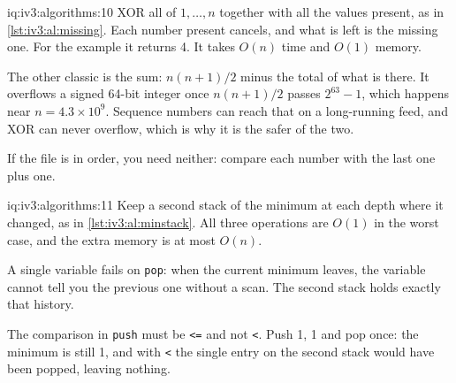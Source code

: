 \begin{solution}{iq:iv3:algorithms:10}
XOR all of $1, \dots, n$ together with all the values present, as in \cref{lst:iv3:al:missing}. Each number present cancels, and what is left is the missing one. For the example it returns 4. It takes $O(n)$ time and $O(1)$ memory.
\label{lst:iv3:al:missing}

The other classic is the sum: $n(n + 1)/2$ minus the total of what is there. It overflows a signed 64-bit integer once $n(n + 1)/2$ passes $2^{63} - 1$, which happens near $n = 4.3 \times 10^9$. Sequence numbers can reach that on a long-running feed, and XOR can never overflow, which is why it is the safer of the two.

If the file is in order, you need neither: compare each number with the last one plus one.

\end{solution}

\begin{solution}{iq:iv3:algorithms:11}
Keep a second stack of the minimum at each depth where it changed, as in \cref{lst:iv3:al:minstack}. All three operations are $O(1)$ in the worst case, and the extra memory is at most $O(n)$.
\label{lst:iv3:al:minstack}

A single variable fails on \texttt{pop}: when the current minimum leaves, the variable cannot tell you the previous one without a scan. The second stack holds exactly that history.

The comparison in \texttt{push} must be \texttt{<=} and not \texttt{<}. Push 1, 1 and pop once: the minimum is still 1, and with \texttt{<} the single entry on the second stack would have been popped, leaving nothing.

\end{solution}

